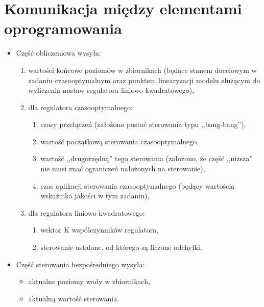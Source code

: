 \section{Komunikacja między elementami oprogramowania}
\label{sec:komunikacja}

\begin{itemize} 
    \item Część obliczeniowa wysyła:
    \begin{enumerate}
        \item wartości końcowe poziomów w zbiornikach (będące stanem docelowym w zadaniu czasooptymalnym oraz punktem linearyzacji modelu służącym do wyliczenia nastaw regulatora liniowo-kwadratowego),
        \item dla regulatora czasooptymalnego:
        \begin{enumerate}
            \item czasy przełączeń (założono postać sterowania typu ,,bang-bang''),
            \item wartość początkową sterowania czasooptymalnego,
            \item wartość ,,drugorzędną'' tego sterowania (założono, że część ,,niższa'' nie musi znać ograniczeń nałożonych na sterowanie),
            \item czas aplikacji sterowania czasooptymalnego (będący wartością wskaźnika jakości w tym zadaniu),
        \end{enumerate}
        \item dla regulatora liniowo-kwadratowego:
        \begin{enumerate}
            \item wektor K współczynników regulatora,
            \item sterowanie ustalone, od którego są liczone odchyłki.
        \end{enumerate}
    \end{enumerate}
    \item Część sterowania bezpośredniego wysyła:
    \begin{itemize}
        \item aktualne poziomy wody w zbiornikach,
        \item aktualną wartość sterowania.
    \end{itemize}
\end{itemize}